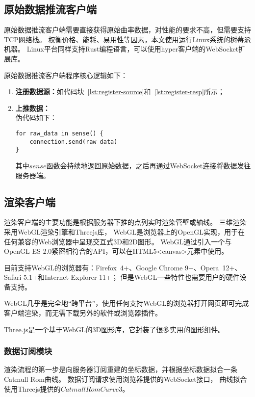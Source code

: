 \subsection{原始数据推流客户端}
原始数据推流客户端需要直接获得原始曲率数据，对性能的要求不高，但需要支持TCP网络栈。
权衡价格、能耗、易用性等因素，本文使用运行Linux系统的树莓派机器。
Linux平台同样支持Rust编程语言，可以使用hyper客户端的WebSocket扩展库。

原始数据推流客户端程序核心逻辑如下：

\begin{enumerate}
\item \textbf{注册数据源：}如代码块~\ref{lst:register-source}和~\ref{lst:register-resp}所示；
\item \textbf{上推数据：} \\
伪代码如下：

\begin{lstlisting}[caption={上推数据}]
for raw_data in sense() {
    connection.send(raw_data)
}
\end{lstlisting}

其中$sense$函数会持续地返回原始数据，之后再通过WebSocket连接将数据发往服务器端。

\end{enumerate}

\subsection{渲染客户端}

渲染客户端的主要功能是根据服务器下推的点列实时渲染管壁或轴线。
三维渲染采用WebGL渲染引擎和Threejs库，
WebGL是浏览器上的OpenGL实现，用于在任何兼容的Web浏览器中呈现交互式3D和2D图形\cite{webgl}。
WebGL通过引入一个与OpenGL ES 2.0紧密相符合的API，可以在HTML5<canvas>元素中使用。

目前支持WebGL的浏览器有：Firefox 4+、Google Chrome 9+、Opera 12+、Safari 5.1+和Internet Explorer 11+；
但是WebGL一些特性也需要用户的硬件设备支持。

WebGL几乎是完全地“跨平台”，使用任何支持WebGL的浏览器打开网页即可完成客户端渲染，而无需下载另外的软件或浏览器插件。

Three.js是一个基于WebGL的3D图形库\cite{threejs}，它封装了很多实用的图形组件。

\subsubsection{数据订阅模块}
渲染流程的第一步是向服务器订阅重建的坐标数据，并根据坐标数据拟合一条Catmull Rom曲线。
数据订阅请求使用浏览器提供的WebSocket接口\cite{mdn-websocket}，
曲线拟合使用Threejs提供的$CatmullRomCurve3$。

